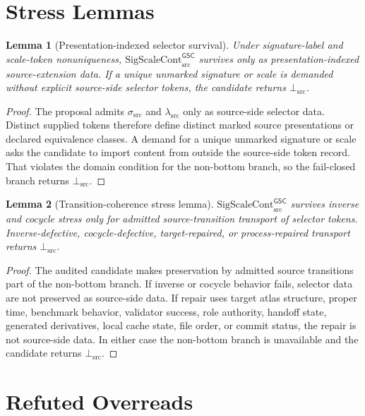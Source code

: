 \documentclass[11pt]{article}
\newcommand{\SigScaleCont}{\mathrm{SigScaleCont}_{\mathrm{src}}^{\mathsf{GSC}}}
\newcommand{\SigTok}{\sigma_{\mathrm{src}}}
\newcommand{\ScaleTok}{\lambda_{\mathrm{src}}}
\newcommand{\BottomSrc}{\bot_{\mathrm{src}}}
\newtheorem{lemma}{Lemma}
\begin{document}
\section{Stress Lemmas}

\begin{lemma}[Presentation-indexed selector survival]
Under signature-label and scale-token nonuniqueness, \(\SigScaleCont\)
survives only as presentation-indexed source-extension data. If a unique
unmarked signature or scale is demanded without explicit source-side selector
tokens, the candidate returns \(\BottomSrc\).
\end{lemma}

\begin{proof}
The proposal admits \(\SigTok\) and \(\ScaleTok\) only as source-side selector
data. Distinct supplied tokens therefore define distinct marked source
presentations or declared equivalence classes. A demand for a unique unmarked
signature or scale asks the candidate to import content from outside the
source-side token record. That violates the domain condition for the
non-bottom branch, so the fail-closed branch returns \(\BottomSrc\).
\end{proof}

\begin{lemma}[Transition-coherence stress lemma]
\(\SigScaleCont\) survives inverse and cocycle stress only for admitted
source-transition transport of selector tokens. Inverse-defective,
cocycle-defective, target-repaired, or process-repaired transport returns
\(\BottomSrc\).
\end{lemma}

\begin{proof}
The audited candidate makes preservation by admitted source transitions part
of the non-bottom branch. If inverse or cocycle behavior fails, selector data
are not preserved as source-side data. If repair uses target atlas structure,
proper time, benchmark behavior, validator success, role authority, handoff
state, generated derivatives, local cache state, file order, or commit status,
the repair is not source-side data. In either case the non-bottom branch is
unavailable and the candidate returns \(\BottomSrc\).
\end{proof}

\section{Refuted Overreads}
\end{document}
